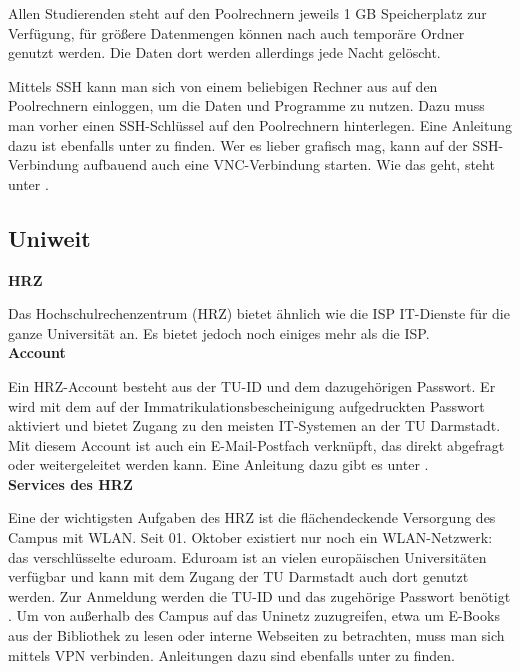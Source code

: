 {    Allen Studierenden steht auf den Poolrechnern jeweils 1 GB Speicherplatz zur Verfügung, für größere Datenmengen können nach \footnotemark[4] auch temporäre Ordner genutzt werden. Die Daten dort werden allerdings jede Nacht gelöscht.

    Mittels SSH \footnotemark[5] kann man sich von einem beliebigen Rechner aus auf den Poolrechnern einloggen, um die Daten und Programme zu nutzen. Dazu muss man vorher einen SSH-Schlüssel auf den Poolrechnern hinterlegen. Eine Anleitung dazu ist ebenfalls unter \footnotemark[5] zu finden.
    Wer es lieber grafisch mag, kann auf der SSH-Verbindung aufbauend auch eine VNC-Verbindung starten. Wie das geht, steht unter \footnotemark[6].\\

    \subsection*{Uniweit}

    \noindent\textbf{HRZ}

    Das Hochschulrechenzentrum (HRZ) \footnotemark[10] bietet ähnlich wie die ISP IT-Dienste für die ganze Universität an. Es bietet jedoch noch einiges mehr als die ISP.\\

    \noindent\textbf{Account}

    Ein HRZ-Account besteht aus der TU-ID und dem dazugehörigen Passwort. Er wird mit dem auf der Immatrikulationsbescheinigung aufgedruckten Passwort aktiviert und bietet Zugang zu den meisten IT-Systemen an der TU Darmstadt. Mit diesem Account ist auch ein E-Mail-Postfach verknüpft, das direkt abgefragt oder weitergeleitet werden kann. Eine Anleitung dazu gibt es unter \footnotemark[11].\\

    \noindent\textbf{Services des HRZ}

    Eine der wichtigsten Aufgaben des HRZ ist die flächendeckende Versorgung des Campus mit WLAN. Seit 01. Oktober existiert nur noch ein WLAN-Netzwerk: das verschlüsselte eduroam. Eduroam ist an vielen europäischen Universitäten verfügbar und kann mit dem Zugang der TU Darmstadt auch dort genutzt werden. Zur Anmeldung werden die TU-ID und das zugehörige Passwort benötigt \footnotemark[12]. Um von außerhalb des Campus auf das Uninetz zuzugreifen, etwa um E-Books aus der Bibliothek zu lesen oder interne Webseiten zu betrachten, muss man sich mittels VPN verbinden. Anleitungen dazu sind ebenfalls unter \footnotemark[12] zu finden.

}
